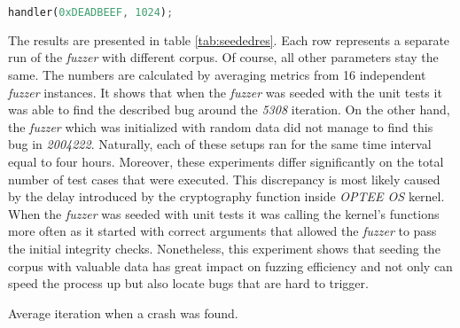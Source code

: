 \begin{minipage}{\linewidth}
    \begin{lstlisting}[language=rust,caption={Unit test for the \textit{handler} function.},label={lst:uthandler}]
handler(0xDEADBEEF, 1024);
    \end{lstlisting}
\end{minipage}

The results are presented in table \ref{tab:seededres}. Each row represents a separate run of the \textit{fuzzer} with different corpus. Of course, all other parameters stay the same. The numbers are calculated by averaging metrics from 16 independent \textit{fuzzer} instances. It shows that when the \textit{fuzzer} was seeded with the unit tests it was able to find the described bug around the \textit{5308} iteration. On the other hand, the \textit{fuzzer} which was initialized with random data did not manage to find this bug in \textit{2004222}. Naturally, each of these setups ran for the same time interval equal to four hours. Moreover, these experiments differ significantly on the total number of test cases that were executed. This discrepancy is most likely caused by the delay introduced by the cryptography function inside \textit{OPTEE OS} kernel. When the \textit{fuzzer} was seeded with unit tests it was calling the kernel's functions more often as it started with correct arguments that allowed the \textit{fuzzer} to pass the initial integrity checks. Nonetheless, this experiment shows that seeding the corpus with valuable data has great impact on fuzzing efficiency and not only can speed the process up but also locate bugs that are hard to trigger.

\begin{table}
    \centering
    
    \caption{Average iteration when a crash was found.}
    \label{tab:seededres}
\end{table}
